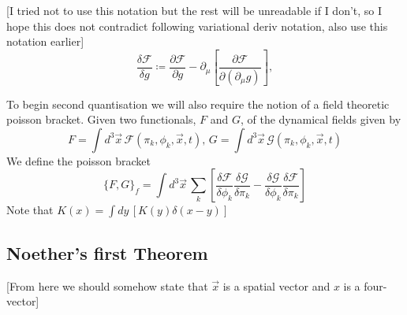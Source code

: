 \documentclass[11pt, a4paper]{article}
\theoremstyle{definition}
\theoremstyle{plain}
\begin{document}
[I tried not to use this notation but the rest will be unreadable if I don't, so I hope this
does not contradict following variational deriv notation, also use this notation earlier]
\begin{equation}
  \frac{\delta \mathcal{F}}{\delta g} \coloneq \frac{\partial \mathcal{F}}{\partial g}
  - \partial_\mu \left[ \frac{\partial \mathcal{F}}{\partial (\partial_\mu g)} \right],
\end{equation}

To begin second quantisation we will also require the notion of a field theoretic poisson bracket.
Given two functionals, $F$ and $G$, of the dynamical fields given by 
\begin{equation}
  F = \int{d^3\vec{x}\, \mathcal{F}(\pi_k, \phi_k, \vec{x}, t)},\,
  G = \int{d^3\vec{x}\, \mathcal{G}(\pi_k, \phi_k, \vec{x}, t)}
\end{equation}
We define the poisson bracket
\begin{equation}
  {\{F, G \}}_{f} = \int{d^3\vec{x}\,
  \sum_{k}{\left[ \frac{\delta \mathcal{F}}{\delta \phi_k}\frac{\delta \mathcal{G}}{\delta \pi_k} 
- \frac{\delta \mathcal{G}}{\delta \phi_k}\frac{\delta \mathcal{F}}{\delta \pi_k} \right]}  }
\end{equation}
Note that $K({x}) = \int{d{y}\,[K({y}) \delta(x - y)]}$


\subsection{Noether's first Theorem}
[From here we should somehow state that $\vec{x}$ is a spatial vector and $x$ is a four-vector]
\end{document}
